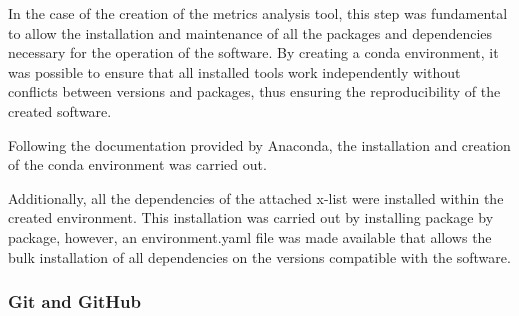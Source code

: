 In the case of the creation of the metrics analysis tool, this step was fundamental to allow the installation and maintenance of all the packages and dependencies necessary for the operation of the software. By creating a conda environment, it was possible to ensure that all installed tools work independently without conflicts between versions and packages, thus ensuring the reproducibility of the created software. %

Following the documentation provided by Anaconda, the installation and creation of the conda environment was carried out.  

Additionally, all the dependencies of the attached x-list were installed within the created environment. This installation was carried out by installing package by package, however, an environment.yaml file was made available that allows the bulk installation of all dependencies on the versions compatible with the software.

\subsubsection{\textbf{Git and GitHub}}